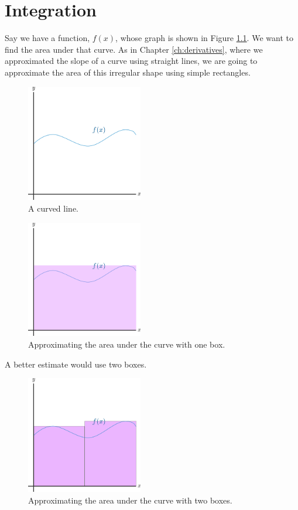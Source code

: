\chapter{Integration}
Say we have a function, $f(x)$, whose graph is shown in Figure \ref{fig:curve}.
We want to find the area under that curve.
As in Chapter \ref{ch:derivatives}, where we approximated the slope of a curve using straight lines,
we are going to approximate the area of this irregular shape using simple rectangles.
\setlength{\parindent}{0pt}
\begin{figure}[H]
  \begin{center}
    \includegraphics[width=2in]{continuous/integration/rei1.eps}
  \end{center}
  \caption{A curved line.}
  \label{fig:curve}
\end{figure}
\begin{figure}[H]
  \begin{center}
    \includegraphics[width=2in]{continuous/integration/rei2.eps}
  \end{center}
  \caption{Approximating the area under the curve with one box.}
\end{figure}
A better estimate would use two boxes.
\begin{figure}[H]
  \begin{center}
    \includegraphics[width=2in]{continuous/integration/rei3.eps}
  \end{center}
  \caption{Approximating the area under the curve with two boxes.}
\end{figure}
